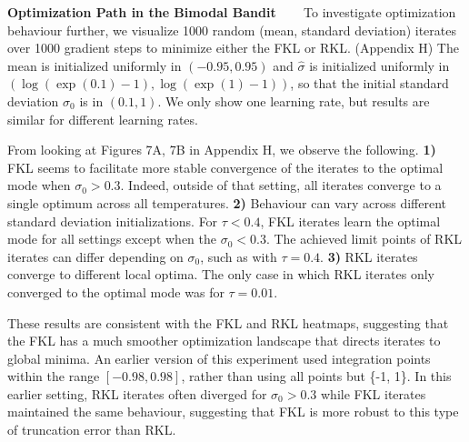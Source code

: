 \documentclass{article}
\newcommand{\myparagraph}[1]{\textbf{#1} \ \ \ }
\begin{document}
\myparagraph{Optimization Path in the Bimodal Bandit}
To investigate optimization behaviour further, we visualize 1000 random (mean, standard deviation) iterates over 1000 gradient steps to minimize either the FKL or RKL. (Appendix H) The mean is initialized uniformly in $(-0.95, 0.95)$ and $\hat{\sigma}$ is initialized uniformly in $(\log(\exp(0.1) - 1), \log(\exp(1) - 1))$, so that the initial standard deviation $\sigma_0$ is in $(0.1, 1)$. We only show one learning rate, but results are similar for different learning rates.

From looking at Figures 7A, 7B in Appendix H, we observe the following. 
\textbf{1)} FKL seems to facilitate more stable convergence of the iterates to the optimal mode when $\sigma_0 > 0.3$. Indeed, outside of that setting, all iterates converge to a single optimum across all temperatures.
\textbf{2)} Behaviour can vary across different standard deviation initializations. For $\tau < 0.4$, FKL iterates learn the optimal mode for all settings except when the $\sigma_0 < 0.3$. The achieved limit points of RKL iterates can differ depending on $\sigma_0$, such as with $\tau = 0.4$. 
\textbf{3)} RKL iterates converge to different local optima. The only case in which RKL iterates only converged to the optimal mode was for $\tau = 0.01$. 
% 

These results are consistent with the FKL and RKL heatmaps, suggesting that the FKL has a much smoother optimization landscape that directs iterates to global minima. An earlier version of this experiment used integration points within the range $[-0.98, 0.98]$, rather than using all points but \{-1, 1\}. In this earlier setting, RKL iterates often diverged for $\sigma_0 > 0.3$ while FKL iterates maintained the same behaviour, suggesting that FKL is more robust to this type of truncation error than RKL. %

\end{document}
